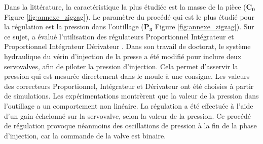 Dans la littérature, la caractéristique la plus étudiée est la masse de la pièce ($\boldsymbol{C_0}$ Figure \ref{fig:annexe_zigzag}).
Le paramètre du procédé qui est le plus étudié pour la régulation est la pression dans l'outillage \cite{fara_evaluation_1985, kamal_dynamics_1987} ($\boldsymbol{P_3}$ Figure \ref{fig:annexe_zigzag}).
Sur ce sujet, \citeauthor{fara_control_1988} a évalué l'utilisation des régulateurs Proportionnel Intégrateur et Proportionnel Intégrateur Dérivateur \cite{fara_control_1988}.
Dans son travail de doctorat, le système hydraulique du vérin d’injection de la presse a été modifié pour inclure deux servovalves, afin de piloter la pression d’injection.
Cela permet d’asservir la pression qui est mesurée directement dans le moule à une consigne.
Les valeurs des correcteurs Proportionnel, Intégrateur et Dérivateur ont été choisies à partir de simulations.
Les expérimentations montrèrent que la valeur de la pression dans l'outillage a un comportement non linéaire.
La régulation a été effectuée à l'aide d'un gain échelonné sur la servovalve, selon la valeur de la pression.
Ce procédé de régulation provoque néanmoins des oscillations de pression à la fin de la phase d'injection, car la commande de la valve est binaire.

